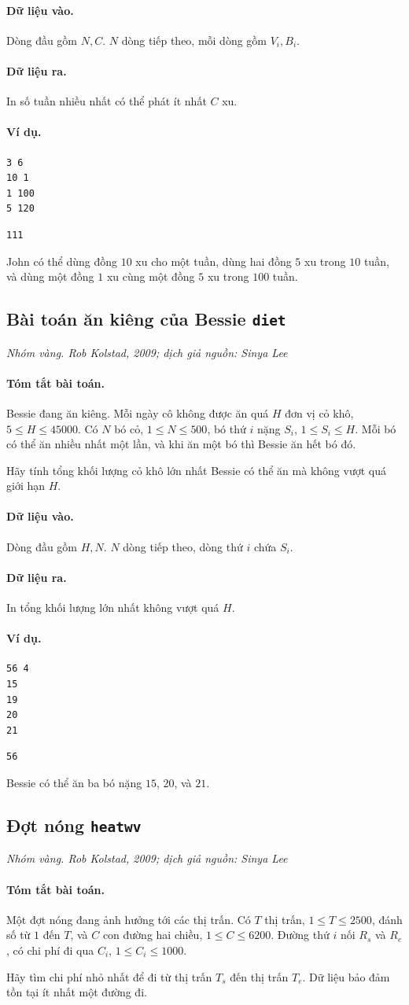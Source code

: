 \documentclass[11pt]{article}
\newcommand{\problem}[4]{%
  \subsection[#1 (#2)]{#1 \hfill {\normalsize\texttt{#2}}}%
  \noindent\textit{#3. #4}\par\smallskip
}
\newcommand{\iosec}[1]{\paragraph{#1}}
\begin{document}
\iosec{Dữ liệu vào.}
Dòng đầu gồm \(N,C\). \(N\) dòng tiếp theo, mỗi dòng gồm \(V_i,B_i\).

\iosec{Dữ liệu ra.}
In số tuần nhiều nhất có thể phát ít nhất \(C\) xu.

\iosec{Ví dụ.}
\begin{verbatim}
3 6
10 1
1 100
5 120
\end{verbatim}

\begin{verbatim}
111
\end{verbatim}

John có thể dùng đồng \(10\) xu cho một tuần, dùng hai đồng \(5\) xu trong
\(10\) tuần, và dùng một đồng \(1\) xu cùng một đồng \(5\) xu trong
\(100\) tuần.

\problem{Bài toán ăn kiêng của Bessie}{diet}{Nhóm vàng}{Rob Kolstad, 2009; dịch giả nguồn: Sinya Lee}

\iosec{Tóm tắt bài toán.}
Bessie đang ăn kiêng. Mỗi ngày cô không được ăn quá \(H\) đơn vị cỏ khô,
\(5\le H\le 45000\). Có \(N\) bó cỏ, \(1\le N\le 500\), bó thứ \(i\) nặng
\(S_i\), \(1\le S_i\le H\). Mỗi bó có thể ăn nhiều nhất một lần, và khi ăn
một bó thì Bessie ăn hết bó đó.

Hãy tính tổng khối lượng cỏ khô lớn nhất Bessie có thể ăn mà không vượt quá
giới hạn \(H\).

\iosec{Dữ liệu vào.}
Dòng đầu gồm \(H,N\). \(N\) dòng tiếp theo, dòng thứ \(i\) chứa \(S_i\).

\iosec{Dữ liệu ra.}
In tổng khối lượng lớn nhất không vượt quá \(H\).

\iosec{Ví dụ.}
\begin{verbatim}
56 4
15
19
20
21
\end{verbatim}

\begin{verbatim}
56
\end{verbatim}

Bessie có thể ăn ba bó nặng \(15\), \(20\), và \(21\).

\problem{Đợt nóng}{heatwv}{Nhóm vàng}{Rob Kolstad, 2009; dịch giả nguồn: Sinya Lee}

\iosec{Tóm tắt bài toán.}
Một đợt nóng đang ảnh hưởng tới các thị trấn. Có \(T\) thị trấn,
\(1\le T\le 2500\), đánh số từ \(1\) đến \(T\), và \(C\) con đường hai chiều,
\(1\le C\le 6200\). Đường thứ \(i\) nối \(R_s\) và \(R_e\), có chi phí đi
qua \(C_i\), \(1\le C_i\le 1000\).

Hãy tìm chi phí nhỏ nhất để đi từ thị trấn \(T_s\) đến thị trấn \(T_e\).
Dữ liệu bảo đảm tồn tại ít nhất một đường đi.
\end{document}
